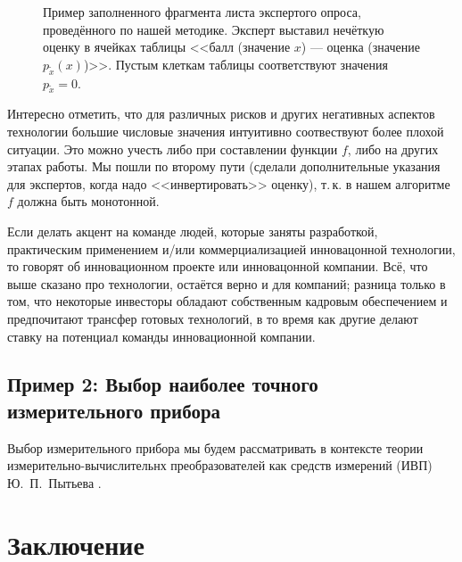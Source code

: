 \documentclass{article}
\begin{document}
\begin{figure}[H]
\caption{\small Пример заполненного фрагмента листа экспертого опроса, проведённого по нашей методике. Эксперт выставил нечёткую оценку в ячейках таблицы <<балл (значение $x$) --- оценка (значение $p_{\tilde x}(x)$)>>. Пустым клеткам таблицы соответствуют значения $p_{\tilde x} = 0$. }
\label{ris:expert_sample}
\end{figure}

Интересно отметить, что для различных рисков и других негативных аспектов технологии большие числовые значения интуитивно соотвествуют более плохой ситуации. Это можно учесть либо при составлении функции $f$, либо на других этапах работы. Мы пошли по второму пути (сделали дополнительные указания для экспертов, когда надо <<инвертировать>> оценку), т.\,к. в нашем алгоритме $f$ должна быть монотонной. 

Если делать акцент на команде людей, которые заняты разработкой, практическим применением и/или коммерциализацией инновацонной технологии, то говорят об инновационном проекте или инновацонной компании. Всё, что выше сказано про технологии, остаётся верно и для компаний; разница только в том, что некоторые инвесторы обладают собственным кадровым обеспечением и предпочитают трансфер готовых технологий, в то время как другие делают ставку на потенциал команды инновационной компании.

\subsection{Пример 2: Выбор наиболее точного измерительного прибора}

Выбор измерительного прибора мы будем рассматривать в контексте теории измерительно-вычислительнх преобразователей как средств измерений (ИВП) Ю.~П.~Пытьева \cite{4}.







\section{Заключение}



\end{document}
